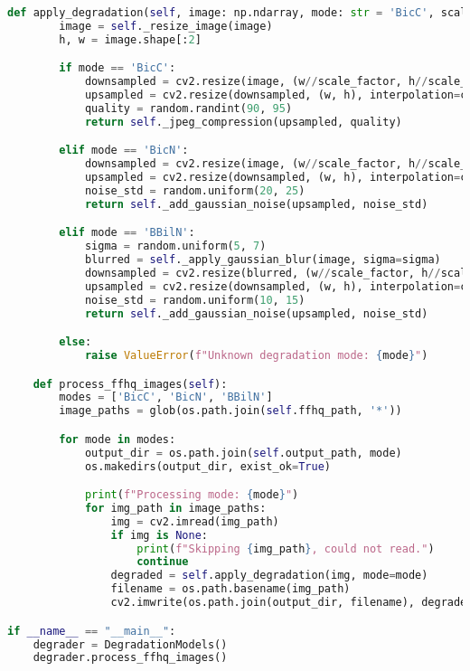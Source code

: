 \begin{sloppypar}
\begin{lstlisting}[language=Python]
    def apply_degradation(self, image: np.ndarray, mode: str = 'BicC', scale_factor: int = 8) -> np.ndarray:
        image = self._resize_image(image)
        h, w = image.shape[:2]

        if mode == 'BicC':
            downsampled = cv2.resize(image, (w//scale_factor, h//scale_factor), interpolation=cv2.INTER_CUBIC)
            upsampled = cv2.resize(downsampled, (w, h), interpolation=cv2.INTER_CUBIC)
            quality = random.randint(90, 95)
            return self._jpeg_compression(upsampled, quality)

        elif mode == 'BicN':
            downsampled = cv2.resize(image, (w//scale_factor, h//scale_factor), interpolation=cv2.INTER_CUBIC)
            upsampled = cv2.resize(downsampled, (w, h), interpolation=cv2.INTER_CUBIC)
            noise_std = random.uniform(20, 25)
            return self._add_gaussian_noise(upsampled, noise_std)

        elif mode == 'BBilN':
            sigma = random.uniform(5, 7)
            blurred = self._apply_gaussian_blur(image, sigma=sigma)
            downsampled = cv2.resize(blurred, (w//scale_factor, h//scale_factor), interpolation=cv2.INTER_LINEAR)
            upsampled = cv2.resize(downsampled, (w, h), interpolation=cv2.INTER_LINEAR)
            noise_std = random.uniform(10, 15)
            return self._add_gaussian_noise(upsampled, noise_std)

        else:
            raise ValueError(f"Unknown degradation mode: {mode}")

    def process_ffhq_images(self):
        modes = ['BicC', 'BicN', 'BBilN']
        image_paths = glob(os.path.join(self.ffhq_path, '*'))

        for mode in modes:
            output_dir = os.path.join(self.output_path, mode)
            os.makedirs(output_dir, exist_ok=True)

            print(f"Processing mode: {mode}")
            for img_path in image_paths:
                img = cv2.imread(img_path)
                if img is None:
                    print(f"Skipping {img_path}, could not read.")
                    continue
                degraded = self.apply_degradation(img, mode=mode)
                filename = os.path.basename(img_path)
                cv2.imwrite(os.path.join(output_dir, filename), degraded)

if __name__ == "__main__":
    degrader = DegradationModels()
    degrader.process_ffhq_images()
\end{lstlisting}


\end{sloppypar}
